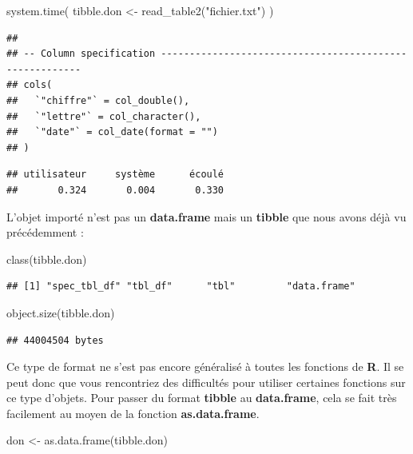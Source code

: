 \documentclass[
]{book}
\newenvironment{Shaded}{\begin{snugshade}}{\end{snugshade}}
\newcommand{\FunctionTok}[1]{\textcolor[rgb]{0.00,0.00,0.00}{#1}}
\newcommand{\NormalTok}[1]{#1}
\newcommand{\OtherTok}[1]{\textcolor[rgb]{0.56,0.35,0.01}{#1}}
\newcommand{\StringTok}[1]{\textcolor[rgb]{0.31,0.60,0.02}{#1}}
\theoremstyle{definition}
\theoremstyle{definition}
\theoremstyle{definition}
\theoremstyle{definition}
\theoremstyle{remark}
\begin{document}
\begin{Shaded}
\begin{Highlighting}[]
\FunctionTok{system.time}\NormalTok{(}
\NormalTok{ tibble.don }\OtherTok{\textless{}{-}} \FunctionTok{read\_table2}\NormalTok{(}\StringTok{"fichier.txt"}\NormalTok{)}
\NormalTok{)}
\end{Highlighting}
\end{Shaded}

\begin{verbatim}
## 
## -- Column specification --------------------------------------------------------
## cols(
##   `"chiffre"` = col_double(),
##   `"lettre"` = col_character(),
##   `"date"` = col_date(format = "")
## )
\end{verbatim}

\begin{verbatim}
## utilisateur     système      écoulé 
##       0.324       0.004       0.330
\end{verbatim}

L'objet importé n'est pas un \textbf{data.frame} mais un \textbf{tibble} que nous avons déjà vu précédemment :

\begin{Shaded}
\begin{Highlighting}[]
\FunctionTok{class}\NormalTok{(tibble.don)}
\end{Highlighting}
\end{Shaded}

\begin{verbatim}
## [1] "spec_tbl_df" "tbl_df"      "tbl"         "data.frame"
\end{verbatim}

\begin{Shaded}
\begin{Highlighting}[]
\FunctionTok{object.size}\NormalTok{(tibble.don)}
\end{Highlighting}
\end{Shaded}

\begin{verbatim}
## 44004504 bytes
\end{verbatim}

Ce type de format ne s'est pas encore généralisé à toutes les fonctions de \textbf{R}. Il se peut donc que vous rencontriez des difficultés pour utiliser certaines fonctions sur ce type d'objets. Pour passer du format \textbf{tibble} au \textbf{data.frame}, cela se fait très facilement au moyen de la fonction \textbf{as.data.frame}.

\begin{Shaded}
\begin{Highlighting}[]
\NormalTok{don }\OtherTok{\textless{}{-}} \FunctionTok{as.data.frame}\NormalTok{(tibble.don)}
\end{Highlighting}
\end{Shaded}
\end{document}
